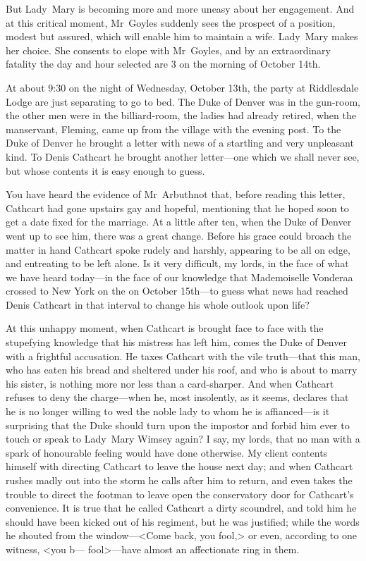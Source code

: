 \begin{dialogue}
But Lady~Mary is becoming more and more uneasy about her engagement. And at this critical moment, Mr~Goyles suddenly sees the prospect of a position, modest but assured, which will enable him to maintain a wife. Lady~Mary makes her choice. She consents to elope with Mr~Goyles, and by an extraordinary fatality the day and hour selected are 3  on the morning of October 14th.

At about 9:30 on the night of Wednesday, October 13th, the party at Riddlesdale Lodge are just separating to go to bed. The Duke of Denver was in the gun-room, the other men were in the billiard-room, the ladies had already retired, when the manservant, Fleming, came up from the village with the evening post. To the Duke of Denver he brought a letter with news of a startling and very unpleasant kind. To Denis Cathcart he brought another letter—one which we shall never see, but whose contents it is easy enough to guess.

You have heard the evidence of Mr~Arbuthnot that, before reading this letter, Cathcart had gone upstairs gay and hopeful, mentioning that he hoped soon to get a date fixed for the marriage. At a little after ten, when the Duke of Denver went up to see him, there was a great change. Before his grace could broach the matter in hand Cathcart spoke rudely and harshly, appearing to be all on edge, and entreating to be left alone. Is it very difficult, my lords, in the face of what we have heard today—in the face of our knowledge that Mademoiselle Vonderaa crossed to New York on the  on October 15th—to guess what news had reached Denis Cathcart in that interval to change his whole outlook upon life?

At this unhappy moment, when Cathcart is brought face to face with the stupefying knowledge that his mistress has left him, comes the Duke of Denver with a frightful accusation. He taxes Cathcart with the vile truth—that this man, who has eaten his bread and sheltered under his roof, and who is about to marry his sister, is nothing more nor less than a card-sharper. And when Cathcart refuses to deny the charge—when he, most insolently, as it seems, declares that he is no longer willing to wed the noble lady to whom he is affianced—is it surprising that the Duke should turn upon the impostor and forbid him ever to touch or speak to Lady~Mary Wimsey again? I say, my lords, that no man with a spark of honourable feeling would have done otherwise. My client contents himself with directing Cathcart to leave the house next day; and when Cathcart rushes madly out into the storm he calls after him to return, and even takes the trouble to direct the footman to leave open the conservatory door for Cathcart's convenience. It is true that he called Cathcart a dirty scoundrel, and told him he should have been kicked out of his regiment, but he was justified; while the words he shouted from the window—<Come back, you fool,> or even, according to one witness, <you b— fool>—have almost an affectionate ring in them. 


\end{dialogue}
